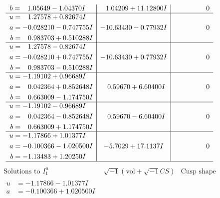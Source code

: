 \documentclass[1p]{elsarticle_modified}
\theoremstyle{definition}
\newcommand{\I}{\sqrt{-1}}
\begin{document}
$$\begin{array}{c|c|c}
\begin{aligned}
b &= \phantom{-}1.05649 - 1.04370 I\end{aligned}
 & \phantom{-}1.04209 + 11.12800 I & \phantom{-0.000000 } 0 \\ \hline\begin{aligned}
u &= \phantom{-}1.27578 + 0.82674 I \\
a &= -0.028210 - 0.747755 I \\
b &= \phantom{-}0.983703 + 0.510288 I\end{aligned}
 & -10.63430 - 0.77932 I & \phantom{-0.000000 } 0 \\ \hline\begin{aligned}
u &= \phantom{-}1.27578 - 0.82674 I \\
a &= -0.028210 + 0.747755 I \\
b &= \phantom{-}0.983703 - 0.510288 I\end{aligned}
 & -10.63430 + 0.77932 I & \phantom{-0.000000 } 0 \\ \hline\begin{aligned}
u &= -1.19102 + 0.96689 I \\
a &= \phantom{-}0.042364 + 0.852648 I \\
b &= \phantom{-}0.663009 - 1.174750 I\end{aligned}
 & \phantom{-}0.59670 + 6.60400 I & \phantom{-0.000000 } 0 \\ \hline\begin{aligned}
u &= -1.19102 - 0.96689 I \\
a &= \phantom{-}0.042364 - 0.852648 I \\
b &= \phantom{-}0.663009 + 1.174750 I\end{aligned}
 & \phantom{-}0.59670 - 6.60400 I & \phantom{-0.000000 } 0 \\ \hline\begin{aligned}
u &= -1.17866 + 1.01377 I \\
a &= -0.100366 - 1.020500 I \\
b &= -1.13483 + 1.20250 I\end{aligned}
 & -5.7029 + 17.1137 I & \phantom{-0.000000 } 0\\
 \hline 
 \end{array}$$\newpage$$\begin{array}{c|c|c}  
\text{Solutions to }I^u_{1}& \I (\text{vol} + \sqrt{-1}CS) & \text{Cusp shape}\\
 \hline 
\begin{aligned}
u &= -1.17866 - 1.01377 I \\
a &= -0.100366 + 1.020500 I \\

\end{aligned}
\end{array}$$
\end{document}
